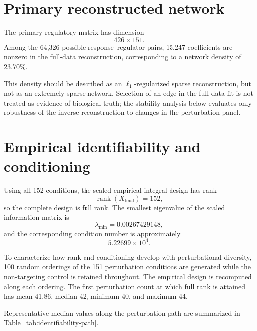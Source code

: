 \documentclass[supplement,onefignum,onetabnum]{siamart251216}
\begin{document}
\section{Primary reconstructed network}

The primary regulatory matrix has dimension
\[
426\times151.
\]
Among the 64,326 possible response--regulator pairs, 15,247 coefficients are nonzero in the full-data reconstruction, corresponding to a network density of 23.70\%.

This density should be described as an \(\ell_1\)-regularized sparse reconstruction, but not as an extremely sparse network. Selection of an edge in the full-data fit is not treated as evidence of biological truth; the stability analysis below evaluates only robustness of the inverse reconstruction to changes in the perturbation panel.

\section{Empirical identifiability and conditioning}

Using all 152 conditions, the scaled empirical integral design has rank
\[
\operatorname{rank}(X_{\mathrm{final}})=152,
\]
so the complete design is full rank. The smallest eigenvalue of the scaled information matrix is
\[
\lambda_{\min}=0.00267429148,
\]
and the corresponding condition number is approximately
\[
5.22699\times10^4.
\]

To characterize how rank and conditioning develop with perturbational diversity, 100 random orderings of the 151 perturbation conditions are generated while the non-targeting control is retained throughout. The empirical design is recomputed along each ordering. The first perturbation count at which full rank is attained has mean 41.86, median 42, minimum 40, and maximum 44.

Representative median values along the perturbation path are summarized in Table~\ref{tab:identifiability-path}.
\end{document}
